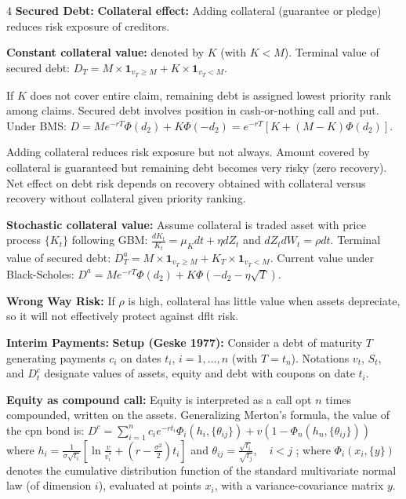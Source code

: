 \documentclass[landscape]{article}
\newcommand{\concept}[1]{\textcolor{conceptcolor}{\textbf{#1}}}
\newcommand{\keyterm}[1]{\textcolor{keycolor}{\textbf{#1}}}
\begin{document}
\begin{multicols}{4}
\textcolor{subsubsectioncolor}{\textbf{Secured Debt:}} \textbf{Collateral effect:} Adding collateral (guarantee or pledge) reduces risk exposure of creditors.

\concept{Constant collateral value:} denoted by $K$ (with $K < M$). Terminal value of secured debt: $D_T = M \times \mathbf{1}_{v_T \geq M} + K \times \mathbf{1}_{v_T < M}$.

If $K$ does not cover entire claim, remaining debt is assigned lowest priority rank among claims. Secured debt involves position in cash-or-nothing call and put. Under BMS: $D = Me^{-rT}\Phi(d_2) + K\Phi(-d_2) = e^{-rT}[K + (M-K)\Phi(d_2)]$.

Adding collateral reduces risk exposure but not always. Amount covered by collateral is guaranteed but remaining debt becomes very risky (zero recovery). Net effect on debt risk depends on recovery obtained with collateral versus recovery without collateral given priority ranking.

\concept{Stochastic collateral value:} Assume collateral is traded asset with price process $\{K_t\}$ following GBM: $\frac{dK_t}{K_t} = \mu_K dt + \eta dZ_t$ and $dZ_t dW_t = \rho dt$. Terminal value of secured debt: $D_T^a = M \times \mathbf{1}_{v_T \geq M} + K_T \times \mathbf{1}_{v_T < M}$. Current value under Black-Scholes: $D^a = Me^{-rT}\Phi(d_2) + K\Phi(-d_2 - \eta\sqrt{T})$.

\keyterm{Wrong Way Risk:} If $\rho$ is high, collateral has little value when assets depreciate, so it will not effectively protect against dflt risk.

\textcolor{subsubsectioncolor}{\textbf{Interim Payments:}} \textbf{Setup (Geske 1977):} Consider a debt of maturity $T$ generating payments $c_i$ on dates $t_i$, $i = 1, \ldots, n$ (with $T = t_n$). Notations $v_t$, $S_t$, and $D_t^c$ designate values of assets, equity and debt with coupons on date $t_i$.

\textbf{Equity as compound call:} Equity is interpreted as a call opt $n$ times compounded, written on the assets. Generalizing Merton's formula, the value of the cpn bond is: $D^c = \sum_{i=1}^{n} c_i e^{-rt_i}\Phi_i(h_i, \{\theta_{ij}\}) + v\left(1 - \Phi_n\left(h_n, \{\theta_{ij}\}\right)\right)$ where $h_i = \frac{1}{\sigma\sqrt{t_i}}\left[\ln \frac{v}{v_i^*} + \left(r - \frac{\sigma^2}{2}\right)t_i\right]$ and $\theta_{ij} = \frac{\sqrt{t_i}}{\sqrt{t_j}}, \quad i < j$
; where $\Phi_i(x_i, \{y\})$ denotes the cumulative distribution function of the standard multivariate normal law (of dimension $i$), evaluated at points $x_i$, with a variance-covariance matrix $y$.


\end{multicols}
\end{document}
